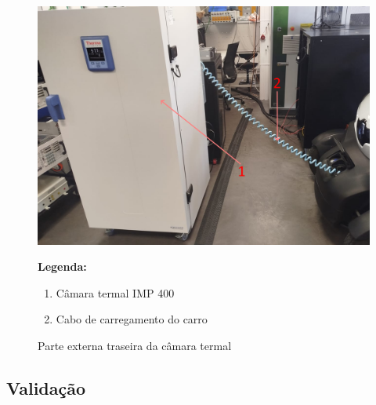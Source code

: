 \begin{figure}[H]
    \centering
    \begin{minipage}{0.6\textwidth}
        \includegraphics[width=\linewidth]{figures/inst_inside_4.png}
    \end{minipage}%
    \hfill
    \begin{minipage}{0.35\textwidth}
        \small
        \textbf{Legenda:}
        \begin{enumerate}
            \item Câmara termal IMP 400
            \item Cabo de carregamento do carro
        \end{enumerate}
    \end{minipage}
    \caption{Parte externa traseira da câmara termal}
    \label{fig:inst_inside_4}
\end{figure}

\subsection{Validação}

